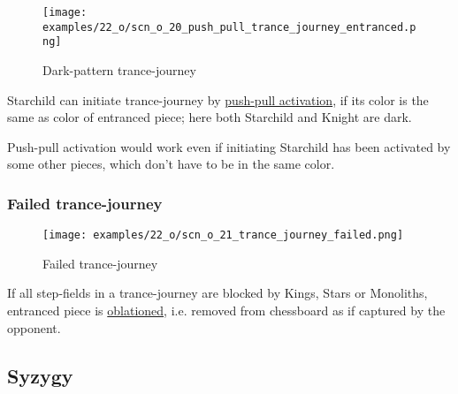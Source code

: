 \clearpage %

\noindent
\begin{figure}[!h]
\texttt{[image: examples/22\_o/scn\_o\_20\_push\_pull\_trance\_journey\_entranced.png]}
\caption{Dark-pattern trance-journey}
\label{fig:scn_o_20_push_pull_trance_journey_entranced}
\end{figure}

Starchild can initiate trance-journey by
\hyperref[sec:Terms/Push-pull activation]{push-pull activation},
if its color is the same as color of entranced piece; here both Starchild and Knight are dark.

Push-pull activation would work even if initiating Starchild has been activated by some other pieces,
which don't have to be in the same color.

\clearpage %

\subsubsection*{Failed trance-journey}

\vspace*{-1.1\baselineskip}
\noindent
\begin{figure}[!h]
\texttt{[image: examples/22\_o/scn\_o\_21\_trance\_journey\_failed.png]}
\caption{Failed trance-journey}
\label{fig:scn_o_21_trance_journey_failed}
\end{figure}

If all step-fields in a trance-journey are blocked by Kings, Stars or Monoliths, entranced piece is
\hyperref[sec:Terms/Oblation]{oblationed}, i.e. removed from chessboard as if captured by the opponent.

\clearpage %

\subsection*{Syzygy}


